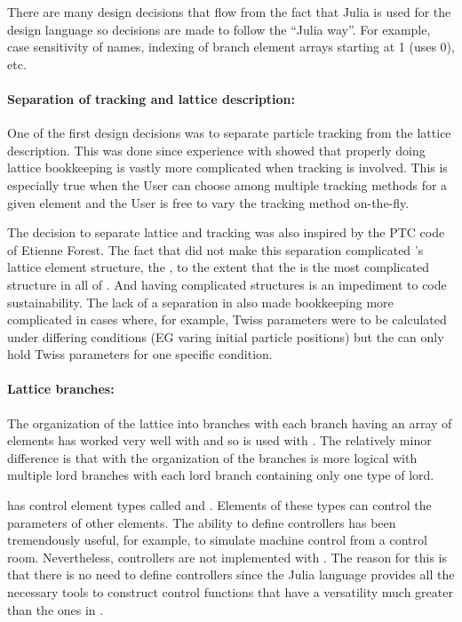 There are many design decisions that flow from the fact that Julia is used for the design language
so decisions are made to follow the ``Julia way''.
For example, case sensitivity of names, indexing of branch element arrays starting at 1 (\bmad uses 0),
etc.

\paragraph{Separation of tracking and lattice description:} 
One of the first \accellat design decisions was to separate particle tracking from the lattice description. 
This was done since experience with \bmad showed that properly doing lattice bookkeeping is vastly
more complicated when tracking is involved. This is especially true when the User can choose
among multiple tracking methods for a given element and the User is free to vary the tracking method
on-the-fly.

The decision to separate lattice and tracking was also inspired by the PTC code of Etienne Forest.
The fact that \bmad did not make this separation complicated \bmad's lattice element structure,
the , 
to the extent that the  is the most complicated structure in all of \bmad. And
having complicated structures is an impediment to code sustainability.
The lack of a separation in \bmad also made bookkeeping more complicated in cases where, for example, 
Twiss parameters were to be calculated under differing conditions (EG varing initial 
particle positions) but the  can only hold Twiss parameters for one specific
condition.

\paragraph{Lattice branches:}
The organization of the lattice into branches with each branch having an array of elements has
worked very well with \bmad and so is used with \accellat. The relatively minor difference is
that with \accellat the organization of the branches is more logical with multiple lord branches
with each lord branch containing only one type of lord.

\bmad has control element types called  and . Elements of these types
can control the parameters of other elements. 
The ability to define controllers has been tremendously useful, for example,
to simulate machine control from a control room. Nevertheless, controllers are not implemented
with \accellat. The reason for this is that there is no need to define controllers since the Julia
language provides all the necessary tools to construct control functions that have a versatility
much greater than the ones in \bmad.

